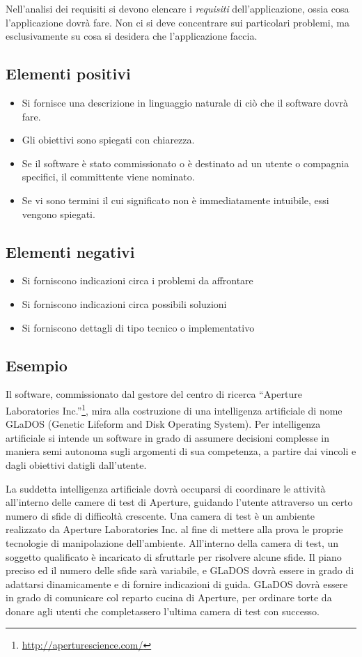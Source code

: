 \documentclass[a4paper,12pt]{report}
\begin{document}
Nell'analisi dei requisiti si devono elencare i \emph{requisiti} dell'applicazione, ossia cosa l'applicazione dovrà fare.
%
Non ci si deve concentrare sui particolari problemi, ma esclusivamente su cosa si desidera che l'applicazione faccia.

\subsection*{Elementi positivi}
\begin{itemize}
	\item Si fornisce una descrizione in linguaggio naturale di ciò che il software dovrà fare.
	\item Gli obiettivi sono spiegati con chiarezza.
	\item Se il software è stato commissionato o è destinato ad un utente o compagnia specifici, il committente viene nominato.
	\item Se vi sono termini il cui significato non è immediatamente intuibile, essi vengono spiegati.
\end{itemize}

\subsection*{Elementi negativi}
\begin{itemize}
	\item Si forniscono indicazioni circa i problemi da affrontare
	\item Si forniscono indicazioni circa possibili soluzioni
	\item Si forniscono dettagli di tipo tecnico o implementativo
\end{itemize}

\subsection*{Esempio}
Il software, commissionato dal gestore del centro di ricerca ``Aperture Laboratories Inc.''\footnote{\url{http://aperturescience.com/}}, mira alla costruzione di una intelligenza artificiale di nome GLaDOS (Genetic Lifeform and Disk Operating System).
%
Per intelligenza artificiale si intende un software in grado di assumere decisioni complesse in maniera semi autonoma sugli argomenti di sua competenza, a partire dai vincoli e dagli obiettivi datigli dall'utente.

La suddetta intelligenza artificiale dovrà occuparsi di coordinare le attività all'interno delle camere di test di Aperture, guidando l'utente attraverso un certo numero di sfide di difficoltà crescente.
%
Una camera di test è un ambiente realizzato da Aperture Laboratories Inc. al fine di mettere alla prova le proprie tecnologie di manipolazione dell'ambiente.
%
All'interno della camera di test, un soggetto qualificato è incaricato di sfruttarle per risolvere alcune sfide.
%
Il piano preciso ed il numero delle sfide sarà variabile, e GLaDOS dovrà essere in grado di adattarsi dinamicamente e di fornire indicazioni di guida.
%
GLaDOS dovrà essere in grado di comunicare col reparto cucina di Aperture, per ordinare torte da donare agli utenti che completassero l'ultima camera di test con successo.
\end{document}
